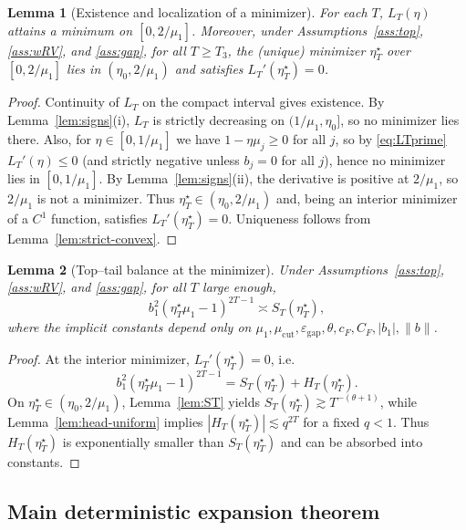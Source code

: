 \documentclass[11pt]{article}
\newtheorem{lemma}{Lemma}
\begin{document}
\begin{lemma}[Existence and localization of a minimizer]\label{lem:minimizer}
For each $T$, $L_T(\eta)$ attains a minimum on $[0,2/\mu_1]$.
Moreover, under Assumptions~\ref{ass:top}, \ref{ass:wRV}, and \ref{ass:gap}, for all $T\ge T_3$,
the (unique) minimizer $\eta_T^\star$ over $[0,2/\mu_1]$ lies in $(\eta_0,2/\mu_1)$
and satisfies $L_T'(\eta_T^\star)=0$.
\end{lemma}

\begin{proof}
Continuity of $L_T$ on the compact interval gives existence.
By Lemma~\ref{lem:signs}(i), $L_T$ is strictly decreasing on $(1/\mu_1,\eta_0]$, so no minimizer lies there.
Also, for $\eta\in[0,1/\mu_1]$ we have $1-\eta\mu_j\ge 0$ for all $j$, so by \eqref{eq:LTprime}
$L_T'(\eta)\le 0$ (and strictly negative unless $b_j=0$ for all $j$), hence no minimizer lies in $[0,1/\mu_1]$.
By Lemma~\ref{lem:signs}(ii), the derivative is positive at $2/\mu_1$, so $2/\mu_1$ is not a minimizer.
Thus $\eta_T^\star\in(\eta_0,2/\mu_1)$ and, being an interior minimizer of a $C^1$ function, satisfies
$L_T'(\eta_T^\star)=0$.
Uniqueness follows from Lemma~\ref{lem:strict-convex}.
\end{proof}

\begin{lemma}[Top--tail balance at the minimizer]\label{lem:balance}
Under Assumptions~\ref{ass:top}, \ref{ass:wRV}, and \ref{ass:gap}, for all $T$ large enough,
\[
b_1^2(\eta_T^\star\mu_1-1)^{2T-1}\asymp S_T(\eta_T^\star),
\]
where the implicit constants depend only on
$\mu_1,\mu_{\mathrm{cut}},\varepsilon_{\mathrm{gap}},\theta,c_F,C_F,|b_1|,\|b\|$.
\end{lemma}

\begin{proof}
At the interior minimizer, $L_T'(\eta_T^\star)=0$, i.e.
\[
b_1^2(\eta_T^\star\mu_1-1)^{2T-1} = S_T(\eta_T^\star)+H_T(\eta_T^\star).
\]
On $\eta_T^\star\in(\eta_0,2/\mu_1)$, Lemma~\ref{lem:ST} yields $S_T(\eta_T^\star)\gtrsim T^{-(\theta+1)}$,
while Lemma~\ref{lem:head-uniform} implies $|H_T(\eta_T^\star)|\lesssim q^{2T}$ for a fixed $q<1$.
Thus $H_T(\eta_T^\star)$ is exponentially smaller than $S_T(\eta_T^\star)$ and can be absorbed into constants.
\end{proof}

\subsection{Main deterministic expansion theorem}
\end{document}
